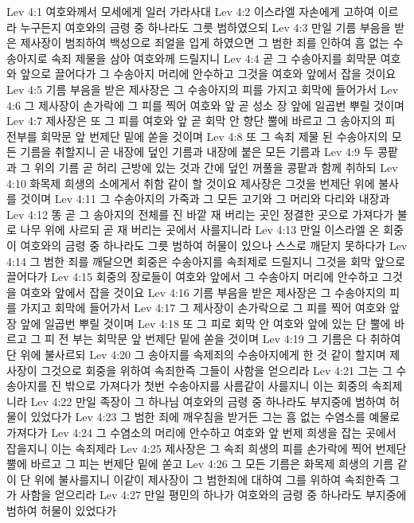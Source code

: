 Lev 4:1  여호와께서 모세에게 일러 가라사대
Lev 4:2  이스라엘 자손에게 고하여 이르라 누구든지 여호와의 금령 중 하나라도 그릇 범하였으되
Lev 4:3  만일 기름 부음을 받은 제사장이 범죄하여 백성으로 죄얼을 입게 하였으면 그 범한 죄를 인하여 흠 없는 수송아지로 속죄 제물을 삼아 여호와께 드릴지니
Lev 4:4  곧 그 수송아지를 회막문 여호와 앞으로 끌어다가 그 수송아지 머리에 안수하고 그것을 여호와 앞에서 잡을 것이요
Lev 4:5  기름 부음을 받은 제사장은 그 수송아지의 피를 가지고 회막에 들어가서
Lev 4:6  그 제사장이 손가락에 그 피를 찍어 여호와 앞 곧 성소 장 앞에 일곱번 뿌릴 것이며
Lev 4:7  제사장은 또 그 피를 여호와 앞 곧 회막 안 향단 뿔에 바르고 그 송아지의 피 전부를 회막문 앞 번제단 밑에 쏟을 것이며
Lev 4:8  또 그 속죄 제물 된 수송아지의 모든 기름을 취할지니 곧 내장에 덮인 기름과 내장에 붙은 모든 기름과
Lev 4:9  두 콩팥과 그 위의 기름 곧 허리 근방에 있는 것과 간에 덮인 꺼풀을 콩팥과 함께 취하되
Lev 4:10  화목제 희생의 소에게서 취함 같이 할 것이요 제사장은 그것을 번제단 위에 불사를 것이며
Lev 4:11  그 수송아지의 가죽과 그 모든 고기와 그 머리와 다리와 내장과
Lev 4:12  똥 곧 그 송아지의 전체를 진 바깥 재 버리는 곳인 정결한 곳으로 가져다가 불로 나무 위에 사르되 곧 재 버리는 곳에서 사를지니라
Lev 4:13  만일 이스라엘 온 회중이 여호와의 금령 중 하나라도 그릇 범하여 허물이 있으나 스스로 깨닫지 못하다가
Lev 4:14  그 범한 죄를 깨달으면 회중은 수송아지를 속죄제로 드릴지니 그것을 회막 앞으로 끌어다가
Lev 4:15  회중의 장로들이 여호와 앞에서 그 수송아지 머리에 안수하고 그것을 여호와 앞에서 잡을 것이요
Lev 4:16  기름 부음을 받은 제사장은 그 수송아지의 피를 가지고 회막에 들어가서
Lev 4:17  그 제사장이 손가락으로 그 피를 찍어 여호와 앞 장 앞에 일곱번 뿌릴 것이며
Lev 4:18  또 그 피로 회막 안 여호와 앞에 있는 단 뿔에 바르고 그 피 전 부는 회막문 앞 번제단 밑에 쏟을 것이며
Lev 4:19  그 기름은 다 취하여 단 위에 불사르되
Lev 4:20  그 송아지를 속제죄의 수송아지에게 한 것 같이 할지며 제사장이 그것으로 회중을 위하여 속죄한즉 그들이 사함을 얻으리라
Lev 4:21  그는 그 수송아지를 진 밖으로 가져다가 첫번 수송아지를 사름같이 사를지니 이는 회중의 속죄제니라
Lev 4:22  만일 족장이 그 하나님 여호와의 금령 중 하나라도 부지중에 범하여 허물이 있었다가
Lev 4:23  그 범한 죄에 깨우침을 받거든 그는 흠 없는 수염소를 예물로 가져다가
Lev 4:24  그 수염소의 머리에 안수하고 여호와 앞 번제 희생을 잡는 곳에서 잡을지니 이는 속죄제라
Lev 4:25  제사장은 그 속죄 희생의 피를 손가락에 찍어 번제단 뿔에 바르고 그 피는 번제단 밑에 쏟고
Lev 4:26  그 모든 기름은 화목제 희생의 기름 같이 단 위에 불사를지니 이같이 제사장이 그 범한죄에 대하여 그를 위하여 속죄한즉 그가 사함을 얻으리라
Lev 4:27  만일 평민의 하나가 여호와의 금령 중 하나라도 부지중에 범하여 허물이 있었다가
